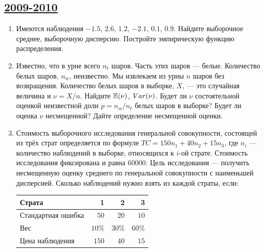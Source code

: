 \subsection[2009-2010]{\hyperref[sec:sol_kr_03_2009_2010]{2009-2010}}
\label{sec:kr_03_2009_2010}


\begin{enumerate}
\item Имеются наблюдения $-1.5$, $2.6$, $1.2$, $-2.1$, $0.1$, $0.9$. Найдите выборочное среднее, выборочную дисперсию. Постройте эмпирическую функцию распределения.
\item Известно, что в урне всего $n_{t}$ шаров. Часть этих шаров — белые. Количество белых шаров, $n_{w}$, неизвестно. Мы извлекаем из урны $n$ шаров без возвращения. Количество белых шаров в выборке, $X$, — это случайная величина и $\nu=X/n$. Найдите $\operatorname{\mathbb{E}}(\nu)$, $\\Var(\nu)$. Будет ли $\nu$ состоятельной оценкой неизвестной доли $p=n_{w}/n_{t}$ белых шаров в выборке? Будет ли оценка $\nu$ несмещенной? Дайте определение несмещенной оценки.
\item Стоимость выборочного исследования генеральной совокупности, состоящей из трёх страт определяется по формуле $TC=150n_1+40n_2+15n_3$, 
где $n_i$ — количество наблюдений в выборке, относящихся к $i$-ой страте. 
Стоимость исследования фиксирована и равна $60000$. 
Цель исследования — получить несмещенную оценку среднего по генеральной совокупности с наименьшей дисперсией. 
Сколько наблюдений нужно взять из каждой страты, если:

\begin{tabular}{@{}lrrr@{}}
\toprule
Страта             & 1      & 2      & 3      \\ \midrule
Стандартная ошибка & $50$   & $20$   & $10$   \\
Вес                & $10\%$ & $30\%$ & $60\%$ \\
Цена наблюдения    & $150$  & $40$   & $15$   \\ \bottomrule
\end{tabular}


\end{enumerate}
